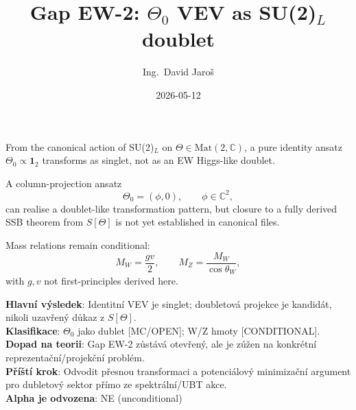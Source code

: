 \documentclass[12pt,a4paper]{article}
\title{Gap EW-2: $\Theta_0$ VEV as SU(2)$_L$ doublet}
\author{Ing.\ David Jaroš}
\date{2026-05-12}
\begin{document}
\maketitle

From the canonical action of SU(2)$_L$ on $\Theta\in\mathrm{Mat}(2,\mathbb C)$,
a pure identity ansatz $\Theta_0\propto\mathbf 1_2$ transforms as singlet, not as
an EW Higgs-like doublet.

A column-projection ansatz
\[
\Theta_0 = (\phi,0),\qquad \phi\in\mathbb C^2,
\]
can realise a doublet-like transformation pattern, but closure to a fully derived
SSB theorem from $S[\Theta]$ is not yet established in canonical files.

Mass relations remain conditional:
\[
M_W = \frac{gv}{2},\qquad M_Z = \frac{M_W}{\cos\theta_W},
\]
with $g,v$ not first-principles derived here.

\begin{statusbox}
\textbf{Hlavní výsledek}: Identitní VEV je singlet; doubletová projekce je kandidát, nikoli uzavřený důkaz z $S[\Theta]$.\\
\textbf{Klasifikace}: $\Theta_0$ jako dublet [MC/OPEN]; W/Z hmoty [CONDITIONAL].\\
\textbf{Dopad na teorii}: Gap EW-2 zůstává otevřený, ale je zúžen na konkrétní reprezentační/projekční problém.\\
\textbf{Příští krok}: Odvodit přesnou transformaci a potenciálový minimizační argument pro dubletový sektor přímo ze spektrální/UBT akce.\\
\textbf{Alpha je odvozena}: NE (unconditional)
\end{statusbox}
\end{document}
